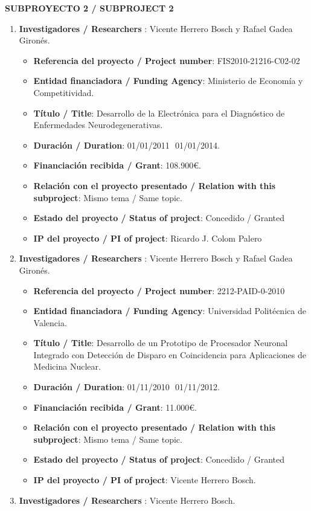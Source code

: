 \noindent\textbf{SUBPROYECTO 2 / SUBPROJECT 2}
\begin{enumerate}
\item {\bf Investigadores / Researchers }: Vicente Herrero Bosch y Rafael Gadea Gironés.
\begin{itemize}
\item {\bf Referencia del proyecto / Project number}: FIS2010-21216-C02-02
\item {\bf Entidad financiadora / Funding Agency}: Ministerio de Economía y Competitividad.
\item {\bf Título / Title}:  Desarrollo de la Electrónica para el Diagnóstico de Enfermedades Neurodegenerativas.
\item {\bf Duración / Duration}: 01/01/2011  01/01/2014. 
\item {\bf Financiación recibida / Grant}: 108.900\euro. 
\item {\bf Relación con el proyecto presentado / Relation with this subproject}: Mismo tema / Same topic. 
\item {\bf Estado del proyecto / Status of project}: Concedido / Granted
\item {\bf IP del proyecto / PI of project}: Ricardo J. Colom Palero
\end{itemize}
\item {\bf Investigadores / Researchers }: Vicente Herrero Bosch y Rafael Gadea Gironés.
\begin{itemize}
\item {\bf Referencia del proyecto / Project number}: 2212-PAID-0-2010
\item {\bf Entidad financiadora / Funding Agency}: Universidad Politécnica de Valencia.
\item {\bf Título / Title}:  Desarrollo de un Prototipo de Procesador Neuronal Integrado con Detección de Disparo en Coincidencia para Aplicaciones de Medicina Nuclear.
\item {\bf Duración / Duration}: 01/11/2010  01/11/2012. 
\item {\bf Financiación recibida / Grant}: 11.000\euro. 
\item {\bf Relación con el proyecto presentado / Relation with this subproject}: Mismo tema / Same topic. 
\item {\bf Estado del proyecto / Status of project}: Concedido / Granted
\item {\bf IP del proyecto / PI of project}: Vicente Herrero Bosch.
\end{itemize}
\item {\bf Investigadores / Researchers }: Vicente Herrero Bosch.

\end{enumerate}
